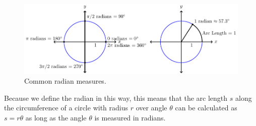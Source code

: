 \begin{figure}[h!]
    \centering
    \includegraphics[width=0.9\columnwidth]{figures/0-5-fig2.pdf}
    \caption{Common radian measures.}
    \label{fig:0.5.radian}
\end{figure}

Because we define the radian in this way, this means that the arc length $s$ along the
circumference of a circle with radius $r$ over angle $\theta$ can be calculated as $s = r
\theta$ as long as the angle $\theta$ is measured in radians.

